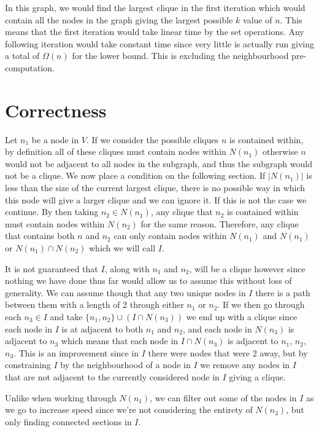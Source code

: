 \documentclass[11pt]{article}
\begin{document}
In this graph, we would find the largest clique in the first iteration which would contain all the nodes in the graph giving the largest possible $k$ value of $n$. This means that the first iteration would take linear time by the set operations. Any following iteration would take constant time since very little is actually run giving a total of $\Omega(n)$ for the lower bound. This is excluding the neighbourhood pre-computation.

\section{Correctness}

Let $n_1$ be a node in $V$. If we consider the possible cliques $n$ is contained within, by definition all of these cliques must contain nodes within $N(n_1)$ otherwise $n$ would not be adjacent to all nodes in the subgraph, and thus the subgraph would not be a clique. We now place a condition on the following section. If $|N(n_1)|$ is less than the size of the current largest clique, there is no possible way in which this node will give a larger clique and we can ignore it. If this is not the case we continue. By then taking $n_2\in N(n_1)$, any clique that $n_2$ is contained within must contain nodes within $N(n_2)$ for the same reason. Therefore, any clique that contains both $n$ and $n_2$ can only contain nodes within $N(n_1)$ and $N(n_1)$ or $N(n_1)\cap N(n_2)$ which we will call $I$.

It is not guaranteed that $I$, along with $n_1$ and $n_2$, will be a clique however since nothing we have done thus far would allow us to assume this without loss of generality. We can assume though that any two unique nodes in $I$ there is a path between them with a length of 2 through either $n_1$ or $n_2$. If we then go through each $n_3\in I$ and take $\{n_1,n_2\}\cup (I\cap N(n_3))$ we end up with a clique since each node in $I$ is at adjacent to both $n_1$ and $n_2$, and each node in $N(n_3)$ is adjacent to $n_3$ which means that each node in $I\cap N(n_3)$ is adjacent to $n_1$, $n_2$, $n_3$. This is an improvement since in $I$ there were nodes that were 2 away, but by constraining $I$ by the neighbourhood of a node in $I$ we remove any nodes in $I$ that are not adjacent to the currently considered node in $I$ giving a clique.

Unlike when working through $N(n_1)$, we can filter out some of the nodes in $I$ as we go to increase speed since we're not considering the entirety of $N(n_3)$, but only finding connected sections in $I$.
\end{document}
